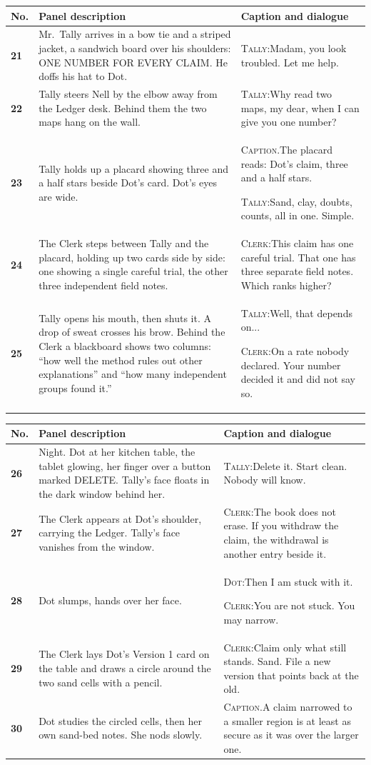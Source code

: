 \documentclass[11pt]{article}
\makeatletter
\newcommand{\nm}[1]{\textsc{#1}}
\newcommand{\cp}[1]{\textsc{Caption.}\enspace #1\par\vspace{2pt}}
\newcommand{\sy}[2]{\nm{#1:}\enspace #2\par\vspace{2pt}}
\newcommand{\fr}[3]{\textbf{#1} & {\small #2} & {\small #3} \\ \midrule}
\newenvironment{sheet}[1]
 {\par\noindent{\footnotesize\textsc{Script page #1 of 8}}\par\vspace{2pt}\noindent
  \begin{tabular}{@{}>{\raggedright\arraybackslash}p{0.28in} >{\raggedright\arraybackslash}p{2.35in} >{\raggedright\arraybackslash}p{3.0in}@{}}\toprule
  \footnotesize No. & \footnotesize Panel description & \footnotesize Caption and dialogue \\ \midrule}
 {\end{tabular}\newpage}
\makeatother
\begin{document}
\begin{sheet}{5}
\fr{21}{Mr.\ Tally arrives in a bow tie and a striped jacket, a sandwich board over his shoulders: ONE NUMBER FOR EVERY CLAIM. He doffs his hat to Dot.}{\sy{Tally}{Madam, you look troubled. Let me help.}}
\fr{22}{Tally steers Nell by the elbow away from the Ledger desk. Behind them the two maps hang on the wall.}{\sy{Tally}{Why read two maps, my dear, when I can give you one number?}}
\fr{23}{Tally holds up a placard showing three and a half stars beside Dot's card. Dot's eyes are wide.}{\cp{The placard reads: Dot's claim, three and a half stars.}\sy{Tally}{Sand, clay, doubts, counts, all in one. Simple.}}
\fr{24}{The Clerk steps between Tally and the placard, holding up two cards side by side: one showing a single careful trial, the other three independent field notes.}{\sy{Clerk}{This claim has one careful trial. That one has three separate field notes. Which ranks higher?}}
\fr{25}{Tally opens his mouth, then shuts it. A drop of sweat crosses his brow. Behind the Clerk a blackboard shows two columns: ``how well the method rules out other explanations'' and ``how many independent groups found it.''}{\sy{Tally}{Well, that depends on...}\sy{Clerk}{On a rate nobody declared. Your number decided it and did not say so.}}
\end{sheet}

\begin{sheet}{6}
\fr{26}{Night. Dot at her kitchen table, the tablet glowing, her finger over a button marked DELETE. Tally's face floats in the dark window behind her.}{\sy{Tally}{Delete it. Start clean. Nobody will know.}}
\fr{27}{The Clerk appears at Dot's shoulder, carrying the Ledger. Tally's face vanishes from the window.}{\sy{Clerk}{The book does not erase. If you withdraw the claim, the withdrawal is another entry beside it.}}
\fr{28}{Dot slumps, hands over her face.}{\sy{Dot}{Then I am stuck with it.}\sy{Clerk}{You are not stuck. You may narrow.}}
\fr{29}{The Clerk lays Dot's Version 1 card on the table and draws a circle around the two sand cells with a pencil.}{\sy{Clerk}{Claim only what still stands. Sand. File a new version that points back at the old.}}
\fr{30}{Dot studies the circled cells, then her own sand-bed notes. She nods slowly.}{\cp{A claim narrowed to a smaller region is at least as secure as it was over the larger one.}}
\end{sheet}
\end{document}
